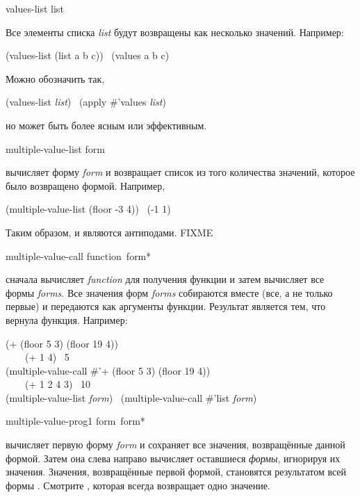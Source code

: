 \begin{defun}[Function]
values-list list

Все элементы списка \emph{list} будут возвращены как несколько значений.
Например:
\begin{lisp}
(values-list (list a b c)) \EQ\ (values a b c)
\end{lisp}
Можно обозначить так,
\begin{lisp}
(values-list \emph{list}) \EQ\ (apply \#'values \emph{list})
\end{lisp}
но  может быть более ясным или эффективным.
\end{defun}

\begin{defmac}
multiple-value-list form

 вычисляет форму \emph{form} и возвращает список из
того количества значений, которое было возвращено формой.
Например,
\begin{lisp}
(multiple-value-list (floor -3 4)) \EV\ (-1 1)
\end{lisp}
Таким образом,  и  являются
антиподами. FIXME
\end{defmac}

\begin{defspec}
multiple-value-call function {\,form}*

 сначала вычисляет \emph{function} для получения
функции и затем вычисляет все формы \emph{forms}. Все значения форм \emph{forms}
собираются вместе (все, а не только первые) и передаются как аргументы
функции. Результат  является тем, что вернула функция.
Например:
\begin{lisp}
(+ (floor 5 3) (floor 19 4)) \\
~~~\EQ\ (+ 1 4) \EV\ 5 \\
(multiple-value-call \#'+ (floor 5 3) (floor 19 4)) \\
~~~\EQ\ (+ 1 2 4 3) \EV\ 10 \\
(multiple-value-list \emph{form}) \EQ\ (multiple-value-call \#'list \emph{form})
\end{lisp}
\end{defspec}

\begin{defspec}
multiple-value-prog1 form {\,form}*

 вычисляет первую форму \emph{form} и сохраняет все
значения, возвращённые данной формой. Затем она слева направо вычисляет оставшиеся
\emph{формы}, игнорируя их значения. Значения, возвращённые первой формой,
становятся результатом всей формы . Смотрите
, которая всегда возвращает одно значение.
\end{defspec}

